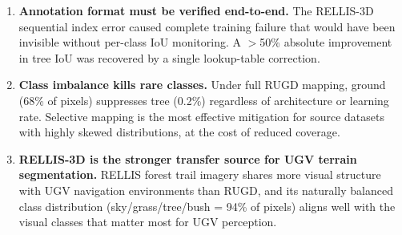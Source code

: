\begin{enumerate}
    \item \textbf{Annotation format must be verified end-to-end.}
          The RELLIS-3D sequential index error caused complete training
          failure that would have been invisible without per-class IoU
          monitoring.  A $>$50\% absolute improvement in tree IoU was
          recovered by a single lookup-table correction.

    \item \textbf{Class imbalance kills rare classes.}
          Under full RUGD mapping, ground (68\% of pixels) suppresses
          tree (0.2\%) regardless of architecture or learning rate.
          Selective mapping is the most effective mitigation for source
          datasets with highly skewed distributions, at the cost of reduced
          coverage.

    \item \textbf{RELLIS-3D is the stronger transfer source for UGV
          terrain segmentation.}
          RELLIS forest trail imagery shares more visual structure with
          UGV navigation environments than RUGD, and its naturally balanced
          class distribution (sky/grass/tree/bush = 94\% of pixels)
          aligns well with the visual classes that matter most for UGV
          perception.
\end{enumerate}

%
%
%
